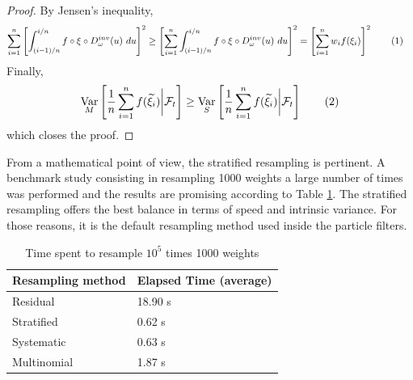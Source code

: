 \documentclass[11pt,a4,twosided,singlespacing,titlepagenumber=on]{scrreprt}
\numberwithin{equation}{chapter} %
\theoremstyle{remark}
\DeclareMathOperator{\var}{Var}
\newcommand\numberthis{\addtocounter{equation}{1}\tag{\theequation}}
\begin{document}
\begin{proof}
By Jensen's inequality,
\begin{align*}
\sum_{i=1}^n \left[ \int_{(i-1)/n}^{i/n} f \circ \xi \circ D_\omega^{inv}(u)\text{ }du\right]^2 &\geq \left[\sum_{i=1}^n \int_{(i-1)/n}^{i/n} f \circ \xi \circ D_\omega^{inv}(u)\text{ }du\right]^2 = \left[ \sum_{i=1}^n w_i f(\xi_i)\right]^2 \numberthis
\end{align*}
Finally,
\begin{equation}
\var_M \left[ \frac{1}{n} \sum_{i=1}^n f(\widetilde{\xi_i}) \bigg| \mathcal{F}_t \right] \geq \var_S \left[ \frac{1}{n} \sum_{i=1}^n f(\widetilde{\xi_i}) \bigg| \mathcal{F}_t \right] \numberthis
\end{equation}
which closes the proof.
\end{proof}

From a mathematical point of view, the stratified resampling is pertinent. A benchmark study consisting in resampling 1000 weights a large number of times was performed and the results are promising according to Table \ref{resampling_method_table}. The stratified resampling offers the best balance in terms of speed and intrinsic variance. For those reasons, it is the default resampling method used inside the particle filters.

\begin{table}[H]
\centering
\begin{tabular}{ll}
\hline
\multicolumn{1}{|l|}{Resampling method}     & \multicolumn{1}{l|}{Elapsed Time (average)} \\ \hline
Residual 					   &  18.90 s \\
Stratified   				 &  0.62 s \\
Systematic   				 &  0.63 s \\
Multinomial          &  1.87 s \\
\hline
\end{tabular}
\caption{Time spent to resample $10^5$ times 1000 weights}
\label{resampling_method_table}
\end{table}
\end{document}
